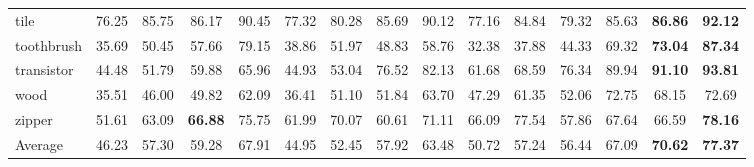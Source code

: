 {\begin{tabular}{l|cc|cc|cc|cc|cc|cc|cc}
tile & 76.25 & 85.75 & 86.17 & 90.45 &  77.32 & 80.28  & 85.69 & 90.12 & 77.16 & 84.84 & 79.32 & 85.63 &\textbf{86.86} &\textbf{92.12} \\
toothbrush & 35.69 & 50.45 & 57.66 & 79.15 &  38.86 & 51.97  & 48.83 & 58.76 & 32.38 & 37.88 & 44.33 & 69.32 &\textbf{73.04} &\textbf{87.34} \\
transistor & 44.48 & 51.79 & 59.88 & 65.96 &  44.93 & 53.04  & 76.52 & 82.13 & 61.68 & 68.59 & 76.34 & {89.94} &\textbf{91.10} &\textbf{93.81} \\
wood & 35.51 & 46.00 & 49.82 & 62.09 &  36.41 & 51.10  & 51.84 & 63.70 & 47.29 & 61.35 & 52.06 & 72.75 & 68.15 & 72.69\\
zipper & 51.61 & 63.09 &\textbf{66.88} & 75.75 &   61.99 & 70.07   & 60.61 & 71.11 & 66.09 & 77.54 & 57.86 & 67.64 & 66.59 &\textbf{78.16} \\ \hline
Average
& 46.23 & 57.30
& 59.28 & 67.91
& 44.95 & 52.45
& 57.92 & 63.48
& 50.72 & 57.24
& 56.44 & 67.09
&\textbf{70.62} &\textbf{77.37} \\ \hline
\end{tabular}
}
\vskip 0.1in


\vskip -0.1in

